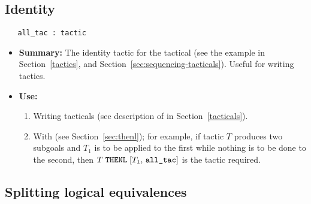



\subsection{Identity}

\begin{holboxed}
\begin{verbatim}
   all_tac : tactic
\end{verbatim}
\end{holboxed}

\begin{itemize}
\item{\bf Summary:} The identity tactic for the tactical \ml{\gt\gt} (see the example in Section~\ref{tactics}, and Section~\ref{sec:sequencing-tacticals}). Useful for writing tactics.

\item{\bf Use:}
\begin{enumerate}
\item Writing tacticals (see description of  in Section~\ref{tacticals}).
\item
With  (see Section~\ref{sec:thenl}); for example, if tactic $T$ produces two subgoals and $T_1$ is to be applied to the first while nothing is to be done to the second, then $T\;\ml{THENL}\;[T_1,\,\ml{all\_tac}]$ is the
tactic required.
\end{enumerate}
\end{itemize}

\subsection{Splitting logical equivalences}


